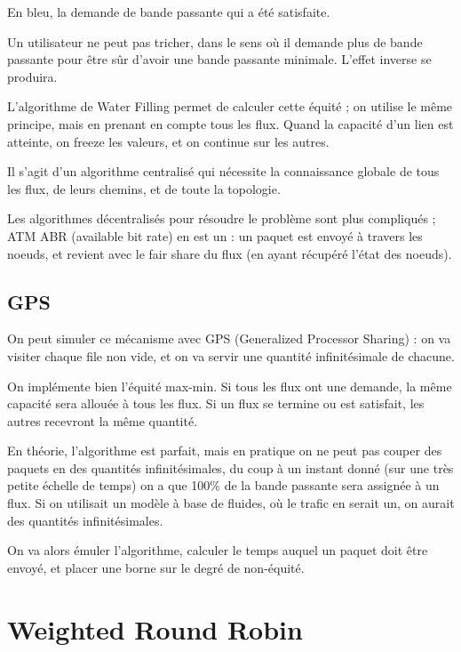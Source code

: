 			En bleu, la demande de bande passante qui a été satisfaite.
						
			Un utilisateur ne peut pas tricher, dans le sens où il demande plus de bande passante pour être sûr d'avoir une bande passante minimale. L'effet inverse se produira.
			
			L'algorithme de Water Filling permet de calculer cette équité ; on utilise le même principe, mais en prenant en compte tous les flux. Quand la capacité d'un lien est atteinte, on freeze les valeurs, et on continue sur les autres.
			
			Il s'agit d'un algorithme centralisé qui nécessite la connaissance globale de tous les flux, de leurs chemins, et de toute la topologie. 
			
			Les algorithmes décentralisés pour résoudre le problème sont plus compliqués ; ATM ABR (available bit rate) en est un : un paquet est envoyé à travers les noeuds, et revient avec le fair share du flux (en ayant récupéré l'état des noeuds).
			
			\subsection{GPS}
			
			On peut simuler ce mécanisme avec GPS (Generalized Processor Sharing) : on va visiter chaque file non vide, et on va servir une quantité infinitésimale de chacune.
			
			
			On implémente bien l'équité max-min. Si tous les flux ont une demande, la même capacité sera allouée à tous les flux. Si un flux se termine ou est satisfait, les autres recevront la même quantité.
			
			En théorie, l'algorithme est parfait, mais en pratique on ne peut pas couper des paquets en des quantités infinitésimales, du coup à un instant donné (sur une très petite échelle de temps) on a que 100\% de la bande passante sera assignée à un flux. Si on utilisait un modèle à base de fluides, où le trafic en serait un, on aurait des quantités infinitésimales.
			
			On va alors émuler l'algorithme, calculer le temps auquel un paquet doit être envoyé, et placer une borne sur le degré de non-équité.			
		
			\section{Weighted Round Robin}
			
